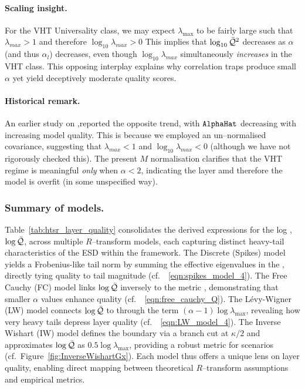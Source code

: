\paragraph{Scaling insight.}
For the VHT Universality class, we may expect $\lambda_{\max}$ to be fairly large such that
$\lambda_{max}>1$ and therefore $\log_{10}\lambda_{max}>0$
This implies that  $\log_{10}\bar{\mathcal{Q}}^{2}$ decreases  as $\alpha$ (and thus $\alpha_l$) decreases, even though
$\log_{10}\lambda_{max}$ simultaneously \emph{increases} in the VHT class.
This opposing interplay explains why correlation traps produce small $\alpha$ yet yield deceptively moderate quality scores.

\paragraph{Historical remark.}
An earlier study on \ALPHAHAT,reported the opposite trend, with $\texttt{AlphaHat}$ decreasing with increasing model quality.
This is because we employed an un–normalised covariance, suggesting that $\lambda_{max}<1$ and $\log_{10}\lambda_{max}<0$
(although we have not rigorously checked this).
The present $M$ normalisation clarifies that the VHT regime is meaningful \emph{only} when $\alpha<2$,
indicating the layer amd therefore the model is overfit (in some unspecified way).


\subsubsection{Summary of models.}

Table~\ref{tab:htsr_layer_quality} consolidates the derived expressions for the log \LayerQuality, \(\log\bar{\mathcal{Q}}\), across multiple \(R\)–transform models, each capturing distinct heavy-tail characteristics of the ESD within the \SETOL framework. The Discrete (Spikes) model yields a Frobenius-like tail norm by summing the effective eigenvalues in the \ECS, directly tying quality to tail magnitude (cf.\ \EQN~\ref{eqn:spikes_model_4}). The Free Cauchy (FC) model links \(\log\bar{\mathcal{Q}}\) inversely to the \HTSR metric \ALPHA, demonstrating that smaller \(\alpha\) values enhance quality (cf.\ \EQN~\ref{eqn:free_cauchy_Q}). The L\'evy-Wigner (LW) model connects \(\log\bar{\mathcal{Q}}\) to \ALPHAHAT through the term \((\alpha-1)\log\lambda_{\max}\), revealing how very heavy tails depress layer quality (cf.\ \EQN~\ref{eqn:LW_model_4}). The Inverse Wishart (IW) model defines the \ECS boundary via a branch cut at \(\kappa/2\) and approximates \(\log\bar{\mathcal{Q}}\) as \(0.5\log\lambda_{\max}\), providing a robust metric for \IdealLearning scenarios (cf.\ Figure~\ref{fig:InverseWishartGx}). Each model thus offers a unique lens on layer quality, enabling direct mapping between theoretical \(R\)–transform assumptions and empirical \WW metrics.

